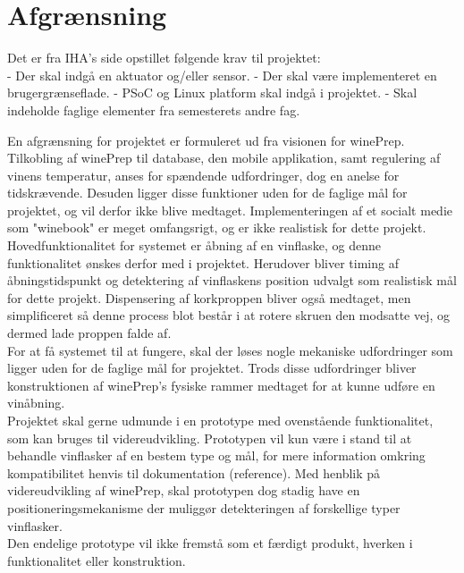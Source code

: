 \chapter{Afgrænsning}
Det er fra IHA's side opstillet følgende krav til projektet:\\
- Der skal indgå en aktuator og/eller sensor.
- Der skal være implementeret en brugergrænseflade.
- PSoC og Linux platform skal indgå i projektet.
- Skal indeholde faglige elementer fra semesterets andre fag.

En afgrænsning for projektet er formuleret ud fra visionen for winePrep. Tilkobling af winePrep til database, den mobile applikation, samt regulering af vinens 
temperatur, anses for spændende udfordringer, dog en anelse for tidskrævende. Desuden ligger disse funktioner uden for de faglige mål for projektet, og vil 
derfor ikke blive medtaget. Implementeringen af et socialt medie som "winebook" er meget omfangsrigt, og er ikke realistisk for dette projekt.\\

Hovedfunktionalitet for systemet er åbning af en vinflaske, og denne funktionalitet ønskes derfor med i projektet. Herudover bliver timing af åbningstidspunkt 
og detektering af vinflaskens position udvalgt som realistisk mål for dette projekt. Dispensering af korkproppen bliver også medtaget, men simplificeret så denne
process blot består i at rotere skruen den modsatte vej, og dermed lade proppen falde af.\\

For at få systemet til at fungere, skal der løses nogle mekaniske udfordringer som ligger uden for de faglige mål for projektet. Trods disse udfordringer
bliver konstruktionen af winePrep's fysiske rammer medtaget for at kunne udføre en vinåbning.\\

Projektet skal gerne udmunde i en prototype med ovenstående funktionalitet, som kan bruges til videreudvikling. Prototypen vil kun være i stand til at behandle 
vinflasker af en bestem type og mål, for mere information omkring kompatibilitet henvis til dokumentation (reference). Med henblik på videreudvikling af winePrep, 
skal prototypen dog stadig have en positioneringsmekanisme der muliggør detekteringen af forskellige typer vinflasker.\\ 

Den endelige prototype vil ikke fremstå som et færdigt produkt, hverken i funktionalitet eller konstruktion. 

    